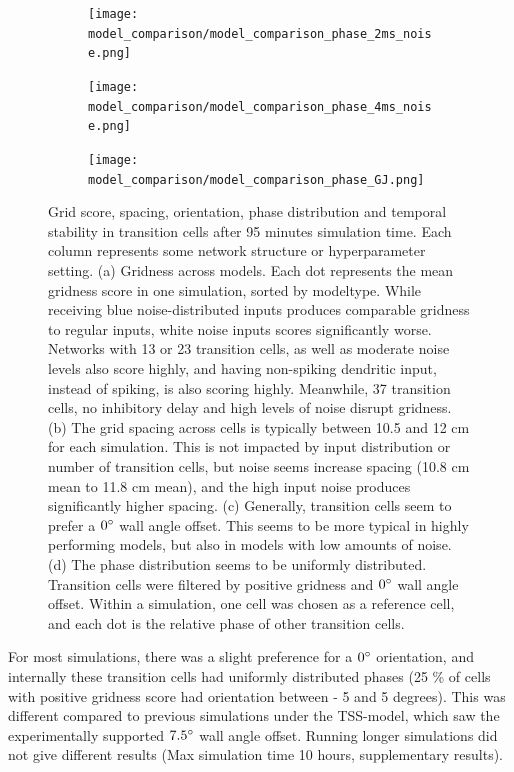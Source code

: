 \documentclass{article}
\begin{document}
\begin{figure}[htbp]
\begin{minipage}[t]{1\textwidth}
\begin{subfigure}{0.08\textwidth}
                \texttt{[image: model\_comparison/model\_comparison\_phase\_2ms\_noise.png]}
            \end{subfigure}
            \begin{subfigure}{0.08\textwidth}
                \texttt{[image: model\_comparison/model\_comparison\_phase\_4ms\_noise.png]}
            \end{subfigure}
            \begin{subfigure}{0.08\textwidth}
                \texttt{[image: model\_comparison/model\_comparison\_phase\_GJ.png]}
            \end{subfigure}
        \end{minipage}%
        
        \caption{Grid score, spacing, orientation, phase distribution and temporal stability in transition cells after 95 minutes simulation time. Each column represents some network structure or hyperparameter setting. (a) Gridness across models. Each dot represents the mean gridness score in one simulation, sorted by modeltype. While receiving blue noise-distributed inputs produces comparable gridness to regular inputs, white noise inputs scores significantly worse. Networks with 13 or 23 transition cells, as well as moderate noise levels also score highly, and having non-spiking dendritic input, instead of spiking, is also scoring highly. Meanwhile, 37 transition cells, no inhibitory delay and high levels of noise disrupt gridness. (b) The grid spacing across cells is typically between 10.5 and 12 cm for each simulation. This is not impacted by input distribution or number of transition cells, but noise seems increase spacing (10.8 cm mean to 11.8 cm mean), and the high input noise produces significantly higher spacing. (c) Generally, transition cells seem to prefer a \(0\degree\) wall angle offset. This seems to be more typical in highly performing models, but also in models with low amounts of noise. (d) The phase distribution seems to be uniformly distributed. Transition cells were filtered by positive gridness and \(0\degree\) wall angle offset. Within a simulation, one cell was chosen as a reference cell, and each dot is the relative phase of other transition cells.}
        
        \label{model_comparison}
    \end{figure}

    For most simulations, there was a slight preference for a \(0\degree\) orientation, and internally these transition cells had uniformly distributed phases (25 \% of cells with positive gridness score had orientation between - 5 and 5 degrees). This was different compared to previous simulations under the TSS-model, which saw the experimentally supported \(7.5\degree\) wall angle offset. Running longer simulations did not give different results (Max simulation time 10 hours, supplementary results). 
\end{document}
